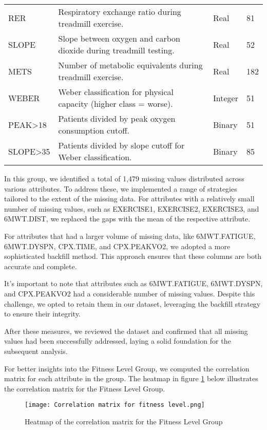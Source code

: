 \begin{table}[H]
\begin{adjustbox}{center}
\begin{tabular}{|p{4.5cm}|p{10cm}|p{1.8cm}|p{1.5cm}|}
    RER & Respiratory exchange ratio during treadmill exercise. & Real & 81 \\
    SLOPE & Slope between oxygen and carbon dioxide during treadmill testing. & Real & 52 \\
    METS & Number of metabolic equivalents during treadmill exercise. & Real & 182 \\
    WEBER & Weber classification for physical capacity (higher class = worse). & Integer & 51 \\
    PEAK>18 & Patients divided by peak oxygen consumption cutoff. & Binary & 51 \\
    SLOPE>35 & Patients divided by slope cutoff for Weber classification. & Binary & 85 \\ \hline
    \end{tabular}
    \end{adjustbox}
\end{table}

In this group, we identified a total of 1,479 missing values distributed across various attributes. To address these, we implemented a range of strategies tailored to the extent of the missing data. For attributes with a relatively small number of missing values, such as EXERCISE1, EXERCISE2, EXERCISE3, and 6MWT.DIST, we replaced the gaps with the mean of the respective attribute.

For attributes that had a larger volume of missing data, like 6MWT.FATIGUE, 6MWT.DYSPN, CPX.TIME, and CPX.PEAKVO2, we adopted a more sophisticated backfill method. This approach ensures that these columns are both accurate and complete.

It's important to note that attributes such as 6MWT.FATIGUE, 6MWT.DYSPN, and CPX.PEAKVO2 had a considerable number of missing values. Despite this challenge, we opted to retain them in our dataset, leveraging the backfill strategy to ensure their integrity.

After these measures, we reviewed the dataset and confirmed that all missing values had been successfully addressed, laying a solid foundation for the subsequent analysis. 

For better insights into the Fitness Level Group, we computed the correlation matrix for each attribute in the group. The heatmap in figure \ref{fig:fitness level group heatmap} below illustrates the correlation matrix for the Fitness Level Group.

\begin{figure}[H]
    \centering
    \texttt{[image: Correlation matrix for fitness level.png]}
    \caption{Heatmap of the correlation matrix for the Fitness Level Group}
    \label{fig:fitness level group heatmap}
\end{figure}

